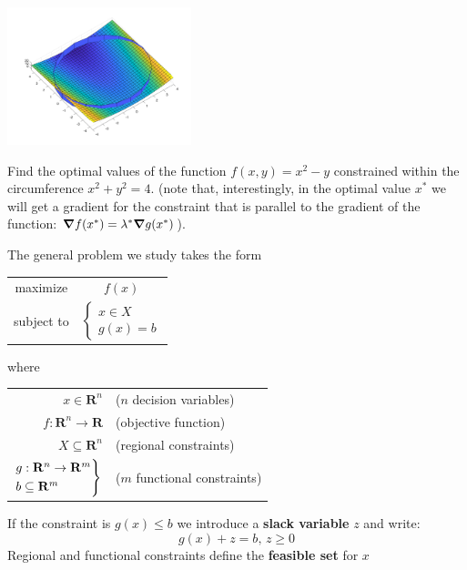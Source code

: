   \begin{center}
  \includegraphics[width=0.4\textwidth]{../figures/Lagrangex2minusy.png}
  \end{center}
  \begin{Exercise}
  Find the optimal values of the function $f(x,y)=x^2-y$ constrained within the circumference $x^2+y^2=4$. (note that, interestingly, in the optimal value $x^*$ we will get a gradient for the constraint that is parallel to the gradient of the function: $\grad f(x^*)=\lambda^* \grad g(x^*)$).
\end{Exercise}
  The general problem we study takes the form
  \begin{center}
  \begin{tabular}{cc}
    maximize & $f(x)$ \\
    subject to & $\begin{cases}x\in X\\g(x)=b\end{cases}$
  \end{tabular}
\end{center}
where
  \begin{center}
  \begin{tabular}{rl}
    $x \in \mathbf{R}^n$ & ($n$ decision variables)\\
    $f: \mathbf{R}^n \rightarrow \mathbf{R}$ & (objective function)\\
    $X \subseteq  \mathbf{R}^n$ & (regional constraints) \\
    $\begin{rcases}
      g: \mathbf{R}^n \rightarrow \mathbf{R}^m\\
      b \subseteq \mathbf{R}^m
    \end{rcases}$ & ($m$ functional constraints)\\
  \end{tabular}
\end{center}
If the constraint is $g(x)\leq b$ we introduce a {\bf slack variable} $z$ and write:
\[g(x)+z=b, \, z\geq0\]
Regional and functional constraints define the {\bf feasible set} for $x$

